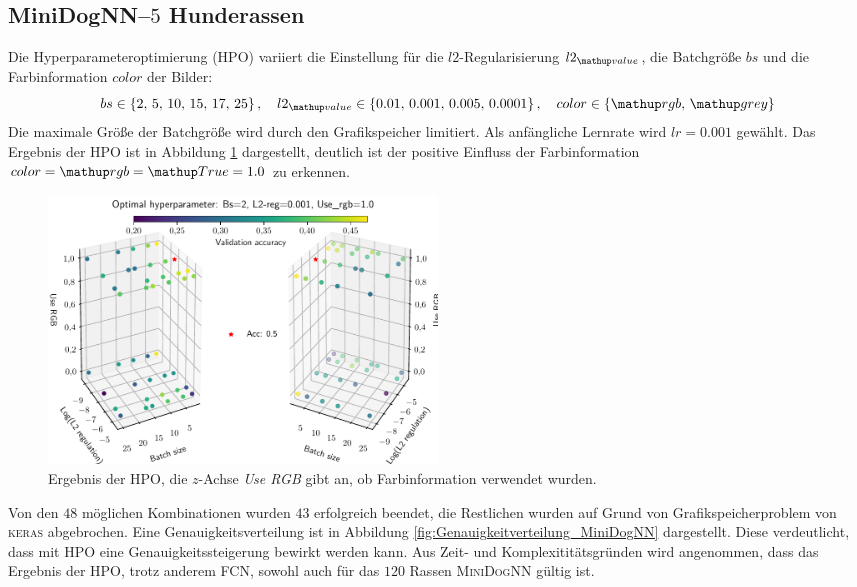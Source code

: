 \subsection{MiniDogNN--$5$ Hunderassen}
Die Hyperparameteroptimierung (HPO) variiert die Einstellung
für die $l2$-Regularisierung $l2\ua{value}$, die Batchgröße $bs$
und die Farbinformation $color$ der Bilder:
\begin{equation}
  \label{eq:Parameterraum_MiniDogNN}
  bs\in\left\{2,\, 5, \,10, \,15,\, 17,\, 25\right\}, \quad l2\ua{value}\in\left\{0.01, \,0.001,\, 0.005,\, 0.0001\right\}, \quad color\in\left\{\map{rgb}, \,\map{grey}\right\}
\end{equation}
Die maximale Größe der Batchgröße wird durch den Grafikspeicher limitiert.
Als anfängliche Lernrate wird $lr=0.001$ gewählt.
Das Ergebnis der HPO ist in Abbildung \ref{fig:Hyperraum_MiniDogNN} dargestellt,
deutlich ist der positive Einfluss der Farbinformation $color=\map{rgb}=\map{True}=1.0$
zu erkennen.
\begin{figure}
\centering
\includegraphics[width=0.5\textwidth]{../../final_data/MiniNN_n5/hyper_raum.pdf}
\caption{Ergebnis der HPO, die $z$-Achse \emph{Use RGB} gibt an, ob Farbinformation
        verwendet wurden.}
\label{fig:Hyperraum_MiniDogNN}
\end{figure}
Von den $48$ möglichen Kombinationen wurden $43$ erfolgreich beendet, die Restlichen
wurden auf Grund von Grafikspeicherproblem von \textsc{keras} abgebrochen. Eine
Genauigkeitsverteilung ist in Abbildung \ref{fig:Genauigkeitverteilung_MiniDogNN}
dargestellt. Diese verdeutlicht, dass mit HPO
eine Genauigkeitssteigerung bewirkt werden kann. Aus Zeit- und Komplexititätsgründen wird
angenommen, dass das Ergebnis der HPO, trotz anderem
FCN, sowohl auch für das $120$ Rassen \textsc{MiniDogNN} gültig ist.

